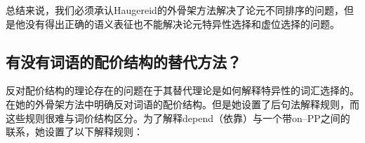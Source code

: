 \begin{exe}
\begin{xlist}[iv.]
\begin{exe}
\begin{xlist}[iv.]

总结来说，我们必须承认Haugereid的外骨架方法解决了论元不同排序的问题，但是他没有得出正确的语义表征也不能解决论元特异性选择和虚位选择的问题。

\subsection{有没有词语的配价结构的替代方法？}
\label{sec-borer}

反对配价结构的理论存在的问题在于其替代理论是如何解释特异性的词汇选择的。 \citet{Borer2005a-u}在她的外骨架方法中明确反对词语的配价结构。但是她设置了后句法解释规则，而这些规则很难与词价结构区分。为了解释depend（依靠）与一个带on--PP之间的联系，她设置了以下解释规则\citep[Vol.\ II，第29页]{Borer2005a-u}：


\end{xlist}
\end{exe}
\end{xlist}
\end{exe}
